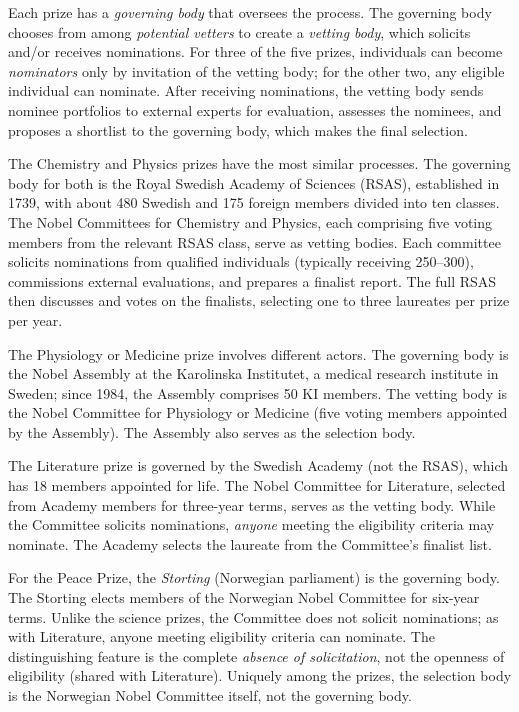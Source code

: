 \documentclass[12pt]{article}
\begin{document}
Each prize has a \emph{governing body} that oversees the process. The governing body chooses from among \emph{potential vetters} to create a \emph{vetting body}, which solicits and/or receives nominations. For three of the five prizes, individuals can become \emph{nominators} only by invitation of the vetting body; for the other two, any eligible individual can nominate. After receiving nominations, the vetting body sends nominee portfolios to external experts for evaluation, assesses the nominees, and proposes a shortlist to the governing body, which makes the final selection.

The Chemistry and Physics prizes have the most similar processes. The governing body for both is the Royal Swedish Academy of Sciences (RSAS), established in 1739, with about 480 Swedish and 175 foreign members divided into ten classes. The Nobel Committees for Chemistry and Physics, each comprising five voting members from the relevant RSAS class, serve as vetting bodies. Each committee solicits nominations from qualified individuals (typically receiving 250--300), commissions external evaluations, and prepares a finalist report. The full RSAS then discusses and votes on the finalists, selecting one to three laureates per prize per year.

The Physiology or Medicine prize involves different actors. The governing body is the Nobel Assembly at the Karolinska Institutet, a medical research institute in Sweden; since 1984, the Assembly comprises 50 KI members. The vetting body is the Nobel Committee for Physiology or Medicine (five voting members appointed by the Assembly). The Assembly also serves as the selection body.

The Literature prize is governed by the Swedish Academy (not the RSAS), which has 18 members appointed for life. The Nobel Committee for Literature, selected from Academy members for three-year terms, serves as the vetting body. While the Committee solicits nominations, \emph{anyone} meeting the eligibility criteria may nominate. The Academy selects the laureate from the Committee's finalist list.

For the Peace Prize, the \emph{Storting} (Norwegian parliament) is the governing body. The Storting elects members of the Norwegian Nobel Committee for six-year terms. Unlike the science prizes, the Committee does not solicit nominations; as with Literature, anyone meeting eligibility criteria can nominate. The distinguishing feature is the complete \emph{absence of solicitation}, not the openness of eligibility (shared with Literature). Uniquely among the prizes, the selection body is the Norwegian Nobel Committee itself, not the governing body.
\end{document}
